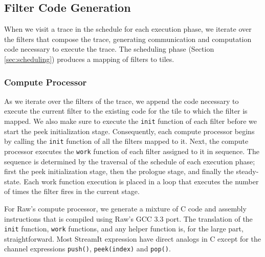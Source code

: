 \subsection{Filter Code Generation}
When we visit a trace in the schedule for each execution phase, we
iterate over the filters that compose the trace, generating 
communication and computation code necessary to execute the trace.
The scheduling phase (Section \ref{sec:scheduling}) produces a mapping
of filters to tiles.

\subsubsection{Compute Processor}
As we iterate over the filters of the trace, we append the code
necessary to execute the current filter to the existing code for the
tile to which the filter is mapped.  We also make sure to execute the
{\tt init} function of each filter before we start the peek
initialization stage. Consequently, each compute processor begins by
calling the {\tt init} function of all the filters mapped to it.
Next, the compute processor executes the {\tt work} function of each
filter assigned to it in sequence.  The sequence is determined by the
traversal of the schedule of each execution phase; first the
peek initialization stage, then the prologue stage, and finally the
steady-state.  Each work function execution is placed in a loop that
executes the number of times the filter fires in the current stage.

For Raw's compute processor, we generate a mixture of C code
and assembly instructions that is compiled using Raw's GCC 3.3
port. The translation of the {\tt init} function, {\tt work}
functions, and any helper function is, for the large part,
straightforward.  Most StreamIt expression have direct analogs in C
except for the channel expressions {\tt push()}, {\tt peek(index)} and
{\tt pop()}.


